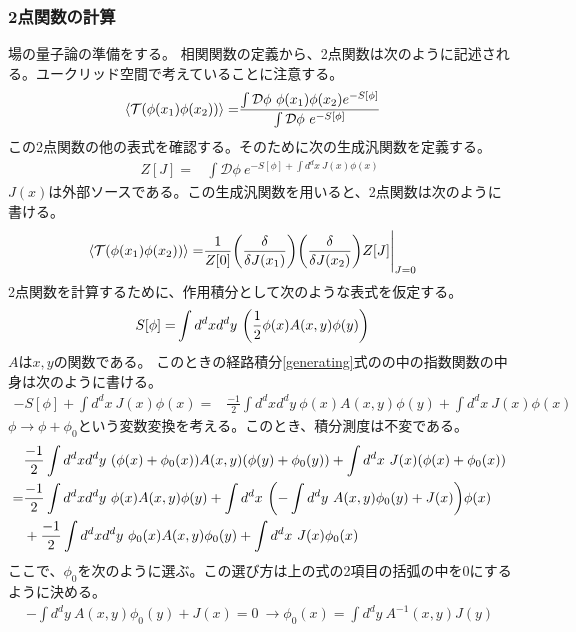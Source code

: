 \documentclass[11pt, dvipdfmx]{article}
\numberwithin{equation}{section}
\begin{document}
\subsubsection{2点関数の計算}
場の量子論の準備をする。
相関関数の定義から、2点関数は次のように記述される。ユークリッド空間で考えていることに注意する。
\begin{align}
    \ev{\mathcal{T}(\phi(x_1)\phi(x_2))}=&\frac{\int \mathcal{D}\phi \ \phi(x_1)\phi(x_2)e^{-S[\phi]}}{\int \mathcal{D}\phi \ e^{-S[\phi]}}\label{2point}
\end{align}
この2点関数の他の表式を確認する。そのために次の生成汎関数を定義する。
\begin{align}
    Z[J]=&\int \mathcal{D}\phi \ e^{-S[\phi]+\int d^dx \ J(x)\phi(x)}\label{generating}
\end{align}
$J(x)$は外部ソースである。この生成汎関数を用いると、2点関数は次のように書ける。
\begin{align}
    \ev{\mathcal{T}(\phi(x_1)\phi(x_2))}=&\frac{1}{Z[0]}\qty(\frac{\delta}{\delta J(x_1)})\qty(\frac{\delta}{\delta J(x_2)})Z[J]\Bigg|_{J=0}
\end{align}
2点関数を計算するために、作用積分として次のような表式を仮定する。
\begin{align}
    S[\phi]=&\int d^dx d^dy \ \qty(\frac{1}{2}\phi(x)A(x,y)\phi(y) )\label{free action}
\end{align}
$A$は$x,y$の関数である。
このときの経路積分\eqref{generating}式のの中の指数関数の中身は次のように書ける。
\begin{align}
    -S[\phi]+\int d^dx \ J(x)\phi(x)=&\frac{-1}{2}\int d^dx d^dy \ \phi(x)A(x,y)\phi(y) + \int d^dx \ J(x)\phi(x)
\end{align}
$\phi\rightarrow\phi+\phi_0$という変数変換を考える。このとき、積分測度は不変である。
\begin{align}
    &\frac{-1}{2}\int d^dx d^dy \ \qty(\phi(x)+\phi_0(x))A(x,y)\qty(\phi(y)+\phi_0(y)) + \int d^dx \ J(x)\qty(\phi(x)+\phi_0(x))\\
    =&\frac{-1}{2}\int d^dx d^dy \ \phi(x)A(x,y)\phi(y) + \int d^dx \ \qty(-\int d^dy \ A(x,y)\phi_0(y) + J(x))\phi(x)\\
    &+\frac{-1}{2}\int d^dx d^dy \ \phi_0(x)A(x,y)\phi_0(y) + \int d^dx \ J(x)\phi_0(x)\nonumber
\end{align}
ここで、$\phi_0$を次のように選ぶ。この選び方は上の式の2項目の括弧の中を0にするように決める。
\begin{align}
    -\int d^dy \ A(x,y)\phi_0(y) + J(x)=0\ \rightarrow \phi_0(x)=\int d^dy \ A^{-1}(x,y)J(y)
\end{align}
\end{document}
